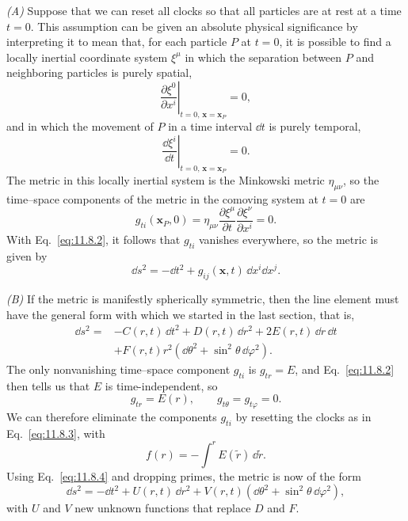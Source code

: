 \emph{(A)} Suppose that we can reset all clocks so that all particles are at
rest at a time \(t=0\). This assumption can be given an absolute physical
significance by interpreting it to mean that, for each particle \(P\) at
\(t=0\), it is possible to find a locally inertial coordinate system
\(\xi^\mu\) in which the separation between \(P\) and neighboring particles is
purely spatial,
\[
  \left.
  \frac{\partial \xi^0}{\partial x^i}
  \right|_{t=0,\,\mathbf{x}=\mathbf{x}_P}
  =0,
\]
and in which the movement of \(P\) in a time interval \(\dd t\) is purely
temporal,
\[
  \left.
  \frac{\dd\xi^i}{\dd t}
  \right|_{t=0,\,\mathbf{x}=\mathbf{x}_P}
  =0.
\]
The metric in this locally inertial system is the Minkowski metric
\(\eta_{\mu\nu}\), so the time--space components of the metric in the
comoving system at \(t=0\) are
\[
  g_{ti}(\mathbf{x}_P,0)
  =
  \eta_{\mu\nu}
  \frac{\partial\xi^\mu}{\partial t}
  \frac{\partial\xi^\nu}{\partial x^i}
  =0.
\]
With Eq.~\eqref{eq:11.8.2}, it follows that \(g_{ti}\) vanishes everywhere,
so the metric is given by
\begin{equation}
  \dd s^2=-\dd t^2+g_{ij}(\mathbf{x},t)\,\dd x^i \dd x^j.
  \tag{11.8.7}\label{eq:11.8.7}
\end{equation}

\emph{(B)} If the metric is manifestly spherically symmetric, then the line
element must have the general form with which we started in the last section,
that is,
\[
  \begin{aligned}
  \dd s^2={}&-C(r,t)\,\dd t^2+D(r,t)\,\dd r^2+2E(r,t)\,\dd r\,\dd t\\
         &+F(r,t)r^2(\dd\theta^2+\sin^2\theta\,\dd\varphi^2).
  \end{aligned}
\]
The only nonvanishing time--space component \(g_{ti}\) is
\(g_{tr}=E\), and Eq.~\eqref{eq:11.8.2} then tells us that \(E\) is
time-independent, so
\[
  g_{tr}=E(r),\qquad g_{t\theta}=g_{t\varphi}=0.
\]
We can therefore eliminate the components \(g_{ti}\) by resetting the clocks
as in Eq.~\eqref{eq:11.8.3}, with
\[
  f(r)=-\int^r E(\tilde r)\,\dd\tilde r.
\]
Using Eq.~\eqref{eq:11.8.4} and dropping primes, the metric is now of the form
\begin{equation}
  \dd s^2
  =
  -\dd t^2+U(r,t)\,\dd r^2
  +V(r,t)(\dd\theta^2+\sin^2\theta\,\dd\varphi^2),
  \tag{11.8.8}\label{eq:11.8.8}
\end{equation}
with \(U\) and \(V\) new unknown functions that replace \(D\) and \(F\).

